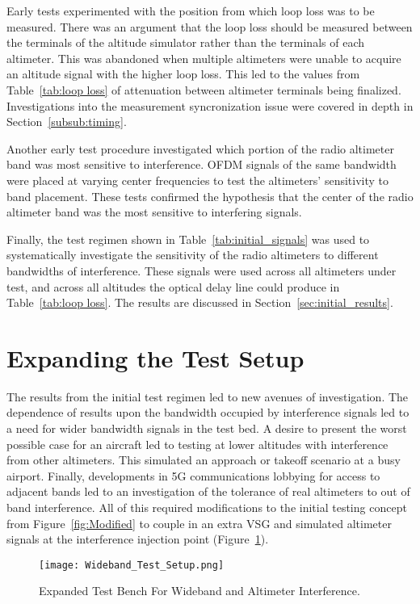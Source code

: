 Early tests experimented with the position from which loop loss was to be measured. There was an argument that the loop loss should be measured between the terminals of the altitude simulator rather than the terminals of each altimeter. This was abandoned when multiple altimeters were unable to acquire an altitude signal with the higher loop loss. This led to the values from Table~\ref{tab:loop loss} of attenuation between altimeter terminals being finalized. Investigations into the measurement syncronization issue were covered in depth in Section~\ref{subsub:timing}.

 Another early test procedure investigated which portion of the radio altimeter band was most sensitive to interference. OFDM signals of the same bandwidth were placed at varying center frequencies to test the altimeters' sensitivity to band placement. These tests confirmed the hypothesis that the center of the radio altimeter band was the most sensitive to interfering signals. 

Finally, the test regimen shown in Table~\ref{tab:initial_signals} was used to systematically investigate the sensitivity of the radio altimeters to different bandwidths of interference. These signals were used across all altimeters under test, and across all altitudes the optical delay line could produce in Table~\ref{tab:loop loss}. The results are discussed in Section~\ref{sec:initial_results}.

\section{Expanding the Test Setup}\label{sec:expanding}
The results from the initial test regimen led to new avenues of investigation. The dependence of results upon the bandwidth occupied by interference signals led to a need for wider bandwidth signals in the test bed. A desire to present the worst possible case for an aircraft led to testing at lower altitudes with interference from other altimeters. This simulated an approach or takeoff scenario at a busy airport. Finally, developments in 5G communications lobbying for access to adjacent bands led to an investigation of the tolerance of real altimeters to out of band interference. All of this required modifications to the initial testing concept from Figure~\ref{fig:Modified} to couple in an extra VSG and simulated altimeter signals at the interference injection point (Figure~\ref{fig:Wideband}).
\begin{figure}[ht]
\centering

\texttt{[image: Wideband\_Test\_Setup.png]}
\caption{Expanded Test Bench For Wideband and Altimeter Interference.}

\label{fig:Wideband}

\end{figure}
